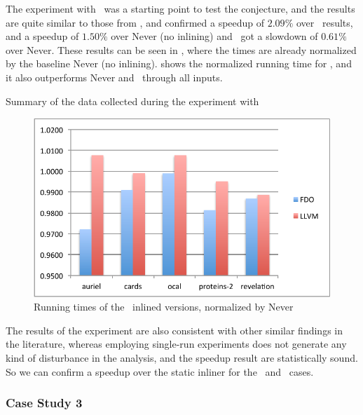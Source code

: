 The experiment with \gzip\ was a starting point to test the conjecture, and the results are quite similar to those from \bzip, and confirmed a speedup of $2.09 \%$ over \llvm\ results, and a speedup of $1.50 \%$ over Never (no inlining) and \llvm\ got a slowdown of $0.61 \%$ over Never. These results can be seen in , where the times are already normalized by the baseline Never (no inlining).  shows the normalized running time for \gzip, and it also outperforms Never and \llvm\ through all inputs.

\begin{table}
  \centering
  \begin{tiny}
  
  \end{tiny}
  \caption{Summary of the data collected during the experiment with \gzip}
  \label{tab:speedupz}
\end{table}

\begin{figure}
  \centering
  \includegraphics[width=1.00\linewidth]{Figures/speedup}
  \caption{Running times of the \gzip\ inlined versions, normalized by Never}
  \label{fig:speedupz}
\end{figure}

The results of the experiment are also consistent with other similar findings in the literature, whereas employing single-run experiments does not generate any kind of disturbance in the analysis, and the speedup result are statistically sound. So we can confirm a speedup over the static inliner for the \bzip\ and \gzip\ cases.

\subsubsection{Case Study 3 \gobmk}

